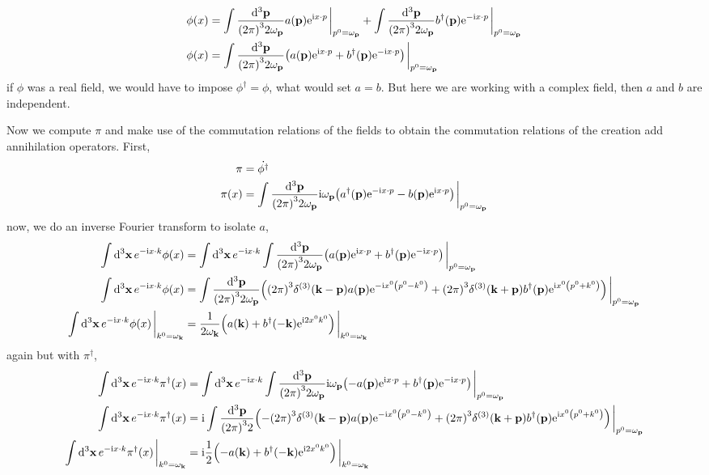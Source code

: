 \begin{align}
    \phi\qty(x)&=\int\frac{\dd[3]{\vb p}}{\qty(2\pi)^32\omega_{\vb p}}a\qty(\vb p)\e^{\im x\cdot p}\eval_{p^0=\omega_{\vb p}}+\int\frac{\dd[3]{\vb p}}{\qty(2\pi)^32\omega_{\vb p}}b^\dagger\qty(\vb p)\e^{-\im x\cdot p}\eval_{p^0=\omega_{\vb p}}\\
    \phi\qty(x)&=\int\frac{\dd[3]{\vb p}}{\qty(2\pi)^32\omega_{\vb p}}\qty(a\qty(\vb p)\e^{\im x\cdot p}+b^\dagger\qty(\vb p)\e^{-\im x\cdot p})\eval_{p^0=\omega_{\vb p}}
\end{align}
if $\phi$ was a real field, we would have to impose $\phi^\dagger = \phi$, what would set $a = b$. But here we are working with a complex field, then $a$ and $b$ are independent.

Now we compute $\pi$ and make use of the commutation relations of the fields to obtain the commutation relations of the creation add 
annihilation operators. First,
\begin{align}
    \pi &= \dot{\phi^\dagger}\\
    \pi\qty(x)&=\int\frac{\dd[3]{\vb p}}{\qty(2\pi)^32\omega_{\vb p}}\im\omega_{\vb p}\qty(a^\dagger\qty(\vb p)\e^{-\im x\cdot p}-b\qty(\vb p)\e^{\im x\cdot p})\eval_{p^0=\omega_{\vb p}}
\end{align}
now, we do an inverse Fourier transform to isolate $a$,
\begin{align}
    \int\dd[3]{\vb x}e^{-\im x\cdot k}\phi\qty(x)&=\int\dd[3]{\vb x}e^{-\im x\cdot k}\int\frac{\dd[3]{\vb p}}{\qty(2\pi)^32\omega_{\vb p}}\qty(a\qty(\vb p)\e^{\im x\cdot p}+b^\dagger\qty(\vb p)\e^{-\im x\cdot p})\eval_{p^0=\omega_{\vb p}}\\
    \int\dd[3]{\vb x}e^{-\im x\cdot k}\phi\qty(x)&=\int\frac{\dd[3]{\vb p}}{\qty(2\pi)^32\omega_{\vb p}}\qty(\qty(2\pi)^3\delta^{\qty(3)}\qty(\vb k-\vb p)a\qty(\vb p)\e^{-\im x^0\qty( p^0-k^0)}+\qty(2\pi)^3\delta^{\qty(3)}\qty(\vb k+\vb p)b^\dagger\qty(\vb p)\e^{\im x^0\qty(p^0+k^0)})\eval_{p^0=\omega_{\vb p}}\\
    \int\dd[3]{\vb x}e^{-\im x\cdot k}\phi\qty(x)\eval_{k^0=\omega_{\vb k}}&=\frac{1}{2\omega_{\vb k}}\qty(a\qty(\vb k)+b^\dagger\qty(-\vb k)\e^{\im 2x^0k^0})\eval_{k^0=\omega_{\vb k}}
\end{align}
again but with $\pi^\dagger$,
\begin{align}
    \int\dd[3]{\vb x}e^{-\im x\cdot k}\pi^\dagger\qty(x)&=\int\dd[3]{\vb x}e^{-\im x\cdot k}\int\frac{\dd[3]{\vb p}}{\qty(2\pi)^32\omega_{\vb p}}\im\omega_{\vb p}\qty(-a\qty(\vb p)\e^{\im x\cdot p}+b^\dagger\qty(\vb p)\e^{-\im x\cdot p})\eval_{p^0=\omega_{\vb p}}\\
    \int\dd[3]{\vb x}e^{-\im x\cdot k}\pi^\dagger\qty(x)&=\im\int\frac{\dd[3]{\vb p}}{\qty(2\pi)^32}\qty(-\qty(2\pi)^3\delta^{\qty(3)}\qty(\vb k-\vb p)a\qty(\vb p)\e^{-\im x^0\qty( p^0-k^0)}+\qty(2\pi)^3\delta^{\qty(3)}\qty(\vb k+\vb p)b^\dagger\qty(\vb p)\e^{\im x^0\qty(p^0+k^0)})\eval_{p^0=\omega_{\vb p}}\\
    \int\dd[3]{\vb x}e^{-\im x\cdot k}\pi^\dagger\qty(x)\eval_{k^0=\omega_{\vb k}}&=\im\frac{1}{2}\qty(-a\qty(\vb k)+b^\dagger\qty(-\vb k)\e^{\im 2x^0k^0})\eval_{k^0=\omega_{\vb k}}
\end{align}

